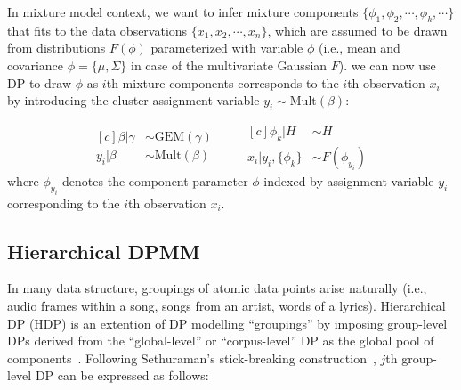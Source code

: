 \documentclass{article}
\begin{document}
In mixture model context, we want to infer mixture components $\{\phi_{1}, \phi_{2}, \cdots, \phi_{k}, \cdots\}$ that fits to the data observations $\{x_{1}, x_{2}, \cdots, x_{n}\}$, which are assumed to be drawn from distributions $F(\phi)$ parameterized with variable $\phi$ (i.e., mean and covariance $\phi = \{\mu, \Sigma\}$ in case of the multivariate Gaussian $F$). we can now use DP to draw $\phi$ as $i$th mixture components corresponds to the $i$th observation $x_{i}$ by introducing the cluster assignment variable $y_{i} \sim \text{Mult}(\beta)$:


\begin{equation}\label{eq:dpmm}
\begin{aligned}[c]
    \beta|\gamma &\sim \text{GEM}(\gamma) \\
    y_{i}|\beta &\sim \text{Mult}(\beta)
\end{aligned}
\qquad
\begin{aligned}[c]
    \phi_{k}|H &\sim H \\
    x_{i}|y_{i},\{\phi_{k}\} &\sim F(\phi_{y_{i}}) 
\end{aligned}
\end{equation}
where $\phi_{y_{i}}$ denotes the component parameter $\phi$ indexed by assignment variable $y_{i}$ corresponding to the $i$th observation $x_{i}$.


\subsection{Hierarchical DPMM}\label{sec:hdpgmm:hdpmm}

In many data structure, groupings of atomic data points arise naturally (i.e., audio frames within a song, songs from an artist, words of a lyrics). Hierarchical DP (HDP) is an extention of DP modelling ``groupings'' by imposing group-level DPs derived from the ``global-level'' or ``corpus-level'' DP as the global pool of components~\cite{doi:10.1198/016214506000000302}. Following Sethuraman's stick-breaking construction~\cite{DBLP:journals/jmlr/WangPB11}, $j$th group-level DP can be expressed as follows:
\end{document}
